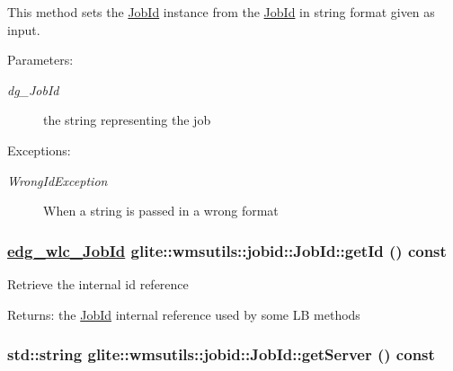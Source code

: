 This method sets the \hyperlink{classglite_1_1wmsutils_1_1jobid_1_1JobId}{Job\-Id} instance from the \hyperlink{classglite_1_1wmsutils_1_1jobid_1_1JobId}{Job\-Id} in string format given as input. \begin{Desc}
\item[Parameters:]
\begin{description}
\item[{\em dg\_\-Job\-Id}]the string representing the job \end{description}
\end{Desc}
\begin{Desc}
\item[Exceptions:]
\begin{description}
\item[{\em Wrong\-Id\-Exception}]When a string is passed in a wrong format \end{description}
\end{Desc}
\hypertarget{classglite_1_1wmsutils_1_1jobid_1_1JobId_a5}{
\subsubsection[getId]{\setlength{\rightskip}{0pt plus 5cm}\hyperlink{cjobid_8h_a2}{edg\_\-wlc\_\-Job\-Id} glite::wmsutils::jobid::Job\-Id::get\-Id () const}}
\label{classglite_1_1wmsutils_1_1jobid_1_1JobId_a5}


Retrieve the internal id reference \begin{Desc}
\item[Returns:]the \hyperlink{classglite_1_1wmsutils_1_1jobid_1_1JobId}{Job\-Id} internal reference used by some LB methods \end{Desc}
\hypertarget{classglite_1_1wmsutils_1_1jobid_1_1JobId_z5_0}{
\subsubsection[getServer]{\setlength{\rightskip}{0pt plus 5cm}std::string glite::wmsutils::jobid::Job\-Id::get\-Server () const}}
\label{classglite_1_1wmsutils_1_1jobid_1_1JobId_z5_0}



